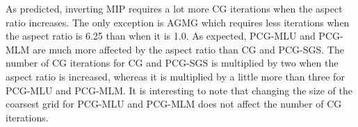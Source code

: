 As predicted, inverting MIP requires a lot more CG iterations when the aspect
ratio increases. The only exception is AGMG which requires less iterations
when the aspect ratio is 6.25 than when it is 1.0. As expected, PCG-MLU and
PCG-MLM are much more affected by the aspect ratio than CG and PCG-SGS.
The number of CG iterations for CG and PCG-SGS is multiplied by two
when the aspect ratio is increased, whereas it is multiplied by a little more
than three for PCG-MLU and PCG-MLM. It is interesting to note
that changing the size of the coarsest grid for PCG-MLU and PCG-MLM does not
affect the number of CG iterations.
